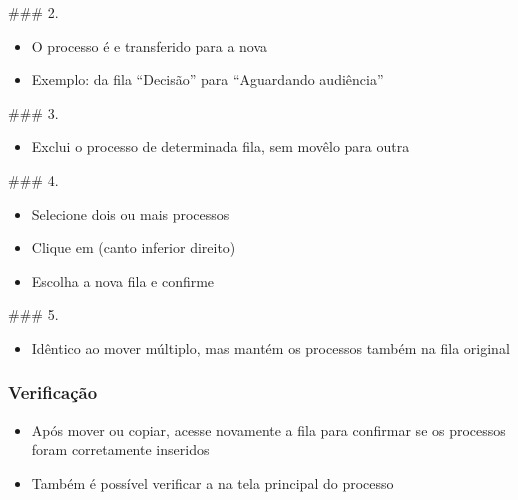 \documentclass[letterpaper,10pt,brazil]{sphinxmanual}
\begin{document}
\sphinxAtStartPar
\#\#\# 2. 
\begin{itemize}
\item {} 
\sphinxAtStartPar
O processo é  e transferido para a nova

\item {} 
\sphinxAtStartPar
Exemplo: da fila “Decisão” para “Aguardando audiência”

\end{itemize}

\sphinxAtStartPar
\#\#\# 3. 
\begin{itemize}
\item {} 
\sphinxAtStartPar
Exclui o processo de determinada fila, sem movê\sphinxhyphen{}lo para outra

\end{itemize}

\sphinxAtStartPar
\#\#\# 4. 
\begin{itemize}
\item {} 
\sphinxAtStartPar
Selecione dois ou mais processos

\item {} 
\sphinxAtStartPar
Clique em  (canto inferior direito)

\item {} 
\sphinxAtStartPar
Escolha a nova fila e confirme

\end{itemize}

\sphinxAtStartPar
\#\#\# 5. 
\begin{itemize}
\item {} 
\sphinxAtStartPar
Idêntico ao mover múltiplo, mas mantém os processos também na fila original

\end{itemize}


\subsubsection{Verificação}
\label{\detokenize{projud_10_filasprocessuais:verificacao}}\begin{itemize}
\item {} 
\sphinxAtStartPar
Após mover ou copiar, acesse novamente a fila para confirmar se os processos foram corretamente inseridos

\item {} 
\sphinxAtStartPar
Também é possível verificar a  na tela principal do processo

\end{itemize}
\end{document}
